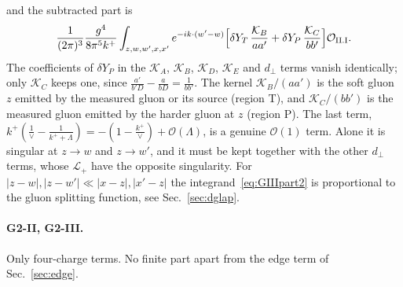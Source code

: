 \documentclass[aps,prd,onecolumn,superscriptaddress,nofootinbib,floatfix,longbibliography,11pt]{revtex4-2}
\numberwithin{equation}{section}
\newcommand{\KK}{\mathcal{K}}
\newcommand{\Lp}{\mathcal{L}_{+}}
\newcommand{\Ord}{\mathcal{O}}
\begin{document}
and the subtracted part is
\begin{equation}
\frac{1}{(2\pi)^3}\frac{g^4}{8\pi^5k^+}\int_{z,w,w',x,x'}e^{-ik\cdot(w'-w)}\Big[\delta Y_T\,\frac{\KK_B}{aa'}+\delta Y_P\,\frac{\KK_C}{bb'}\Big]\Ord_{\rm II.I}.
\end{equation}
The coefficients of $\delta Y_P$ in the $\KK_A$, $\KK_B$, $\KK_D$, $\KK_E$ and $d_\perp$ terms vanish identically; only $\KK_C$ keeps one, since $\frac{a'}{b'D}-\frac{a}{bD}=\frac{1}{bb'}$. The kernel $\KK_B/(aa')$ is the soft gluon $z$ emitted by the measured gluon or its source (region T), and $\KK_C/(bb')$ is the measured gluon emitted by the harder gluon at $z$ (region P). The last term, $k^+(\frac1\vee-\frac{1}{k^++\Lambda})=-(1-\frac{k^+}{\vee})+\Ord(\Lambda)$, is a genuine $\Ord(1)$ term. Alone it is singular at $z\to w$ and $z\to w'$, and it must be kept together with the other $d_\perp$ terms, whose $\Lp$ have the opposite singularity. For $|z-w|,|z-w'|\ll|x-z|,|x'-z|$ the integrand~\eqref{eq:GIIIpart2} is proportional to the gluon splitting function, see Sec.~\ref{sec:dglap}.

\paragraph*{G2-II, G2-III.} Only four-charge terms. No finite part apart from the edge term of Sec.~\ref{sec:edge}.
\end{document}
